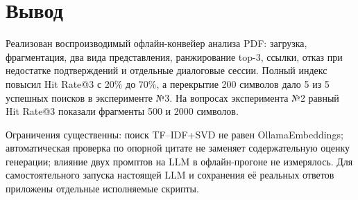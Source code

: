 \documentclass[12pt,a4paper]{article}
\begin{document}
\section{Вывод}
Реализован воспроизводимый офлайн-конвейер анализа PDF: загрузка, фрагментация, два вида представления, ранжирование top-3, ссылки, отказ при недостатке подтверждений и отдельные диалоговые сессии. Полный индекс повысил Hit Rate@3 с 20\% до 70\%, а перекрытие 200 символов дало 5 из 5 успешных поисков в эксперименте №3. На вопросах эксперимента №2 равный Hit Rate@3 показали фрагменты 500 и 2000 символов.

Ограничения существенны: поиск TF--IDF+SVD не равен OllamaEmbeddings; автоматическая проверка по опорной цитате не заменяет содержательную оценку генерации; влияние двух промптов на LLM в офлайн-прогоне не измерялось. Для самостоятельного запуска настоящей LLM и сохранения её реальных ответов приложены отдельные исполняемые скрипты.
\end{document}

